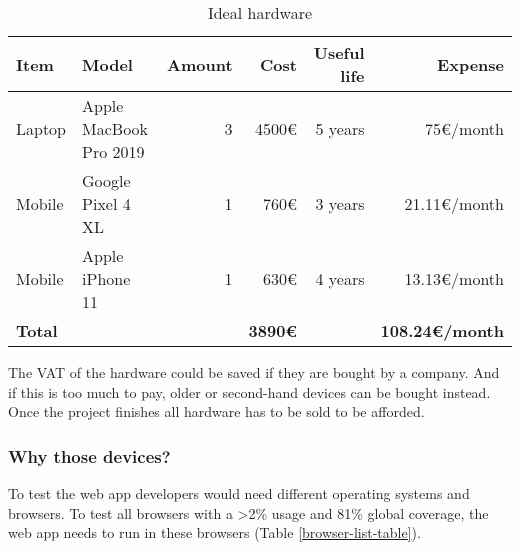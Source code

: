 \begin{table}[h!]
\centering
\begin{tabular}{llrrrr}
    \toprule
    \textbf{Item} & \textbf{Model} & \textbf{Amount} & \textbf{Cost} & \textbf{Useful life} & \textbf{Expense} \\
    \midrule
    Laptop & Apple MacBook Pro 2019 & 3 & 4500€ & 5 years & 75€/month \\
    Mobile & Google Pixel 4 XL & 1 & 760€ & 3 years & 21.11€/month \\
    Mobile & Apple iPhone 11 & 1 & 630€ & 4 years & 13.13€/month \\
    \midrule
    \textbf{Total} & & & \textbf{3890€} & & \textbf{108.24€/month} \\
    \bottomrule
\end{tabular}
\caption{Ideal hardware}
\label{ideal-hardware}
\end{table}

The VAT of the hardware could be saved if they are bought by a company.
And if this is too much to pay, older or second-hand devices can be bought instead. Once the project finishes all hardware has to be sold to be afforded.

\subsubsection{Why those devices?}

To test the web app developers would need different operating systems and browsers. To test all browsers with a >2\% usage and 81\% global coverage, the web app needs to run in these browsers (Table \ref{browser-list-table}).

